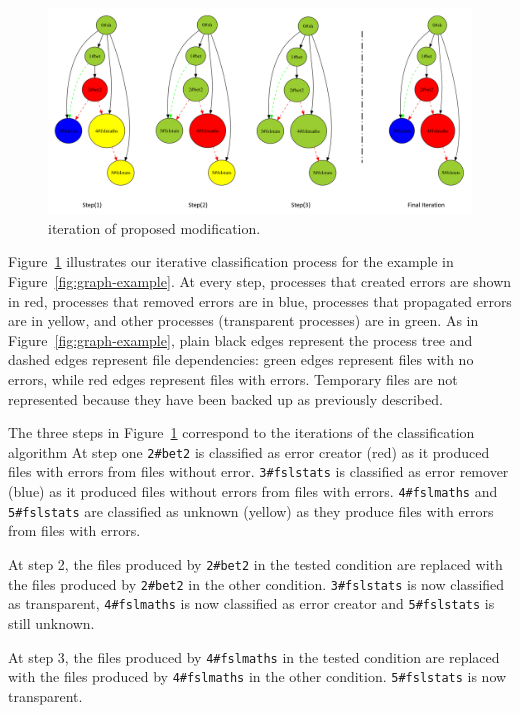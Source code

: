 \documentclass{article}
\begin{document}
\begin{figure}[H]
\centering
  \includegraphics[scale=0.5]{images/iterative_modif}
  \caption{iteration of proposed modification.}
  \label{fig:iterations}
\end{figure}

Figure~\ref{fig:iterations} illustrates our iterative classification 
process for the example in Figure~\ref{fig:graph-example}. At every 
step, processes that created errors are shown in red, processes that 
removed errors are in blue, processes that propagated errors are in 
yellow, and other processes (transparent processes) are in green. As in 
Figure~\ref{fig:graph-example}, plain black edges represent the process 
tree and dashed edges represent file dependencies: green edges 
represent files with no errors, while red edges represent files with 
errors. Temporary files are not represented because they have been 
backed up as previously described.

The three steps in Figure~\ref{fig:iterations} correspond to the 
iterations of the classification algorithm At step one \texttt{2\#bet2} 
is classified as error creator (red) as it produced files with errors 
from files without error. \texttt{3\#fslstats} is classified as error 
remover (blue) as it produced files without errors from files with 
errors. \texttt{4\#fslmaths} and \texttt{5\#fslstats} are classified as 
unknown (yellow) as they produce files with errors from files with errors.

At step 2, the files produced by \texttt{2\#bet2} in the tested 
condition are replaced with the files produced by \texttt{2\#bet2} in 
the other condition. \texttt{3\#fslstats} is now classified as transparent, \texttt{4\#fslmaths} is now classified
as error creator and \texttt{5\#fslstats} is still unknown.

 At step 3, the files produced by \texttt{4\#fslmaths} in the tested 
 condition are replaced with the files produced by \texttt{4\#fslmaths} 
 in the other condition. \texttt{5\#fslstats} is now transparent.
 
\end{document}
